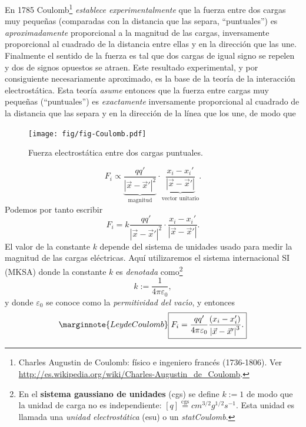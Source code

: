 En 1785 Coulomb\footnote{Charles Augustin de Coulomb: físico e ingeniero francés (1736-1806). Ver \url{http://es.wikipedia.org/wiki/Charles-Augustin_de_Coulomb}.} \textit{establece experimentalmente} que la fuerza entre dos cargas muy peque\~nas (comparadas con la distancia que las separa, ``puntuales'') es \textit{aproximadamente}  proporcional a la magnitud de las cargas, inversamente proporcional al cuadrado de la distancia entre ellas y en la dirección que las
une. Finalmente el sentido de la fuerza es tal que dos cargas de igual signo se repelen y dos de signos opuestos se atraen. Este resultado experimental, y por consiguiente necesariamente aproximado, es la base de la teoría de la interacción electrostática. Esta teoría \textit{asume} entonces que la fuerza entre cargas muy pequeñas (``puntuales'') es \textit{exactamente} inversamente proporcional al cuadrado de la distancia que las separa y en la dirección de la línea que los une, de modo que
\begin{center}
\begin{figure}[H]
\centerline{\texttt{[image: fig/fig-Coulomb.pdf]}}
\caption{Fuerza electrostática entre dos cargas puntuales.}
\label{fig:Coulomb}
\end{figure}
\end{center}
\begin{equation}
F_i\propto \underbrace{\frac{qq'}{\left\vert \vec x-\vec
x'\right\vert^2}}_\text{magnitud}\cdot
\underbrace{\frac{x_i-x_i'}{\left\vert \vec x-\vec x'\right\vert }}_\text{vector unitario}.
\end{equation}
Podemos por tanto escribir
\begin{equation}
F_i=k\frac{qq'}{\left\vert \vec x-\vec x'\right\vert^2}
\cdot\frac{x_i-x_i'}{\left\vert \vec x-\vec x'\right\vert }.
\end{equation}
El valor de la constante $k$ depende del sistema de unidades usado para medir la magnitud de las cargas eléctricas. Aquí utilizaremos el sistema internacional SI (MKSA) donde la constante $k$ es \textit{denotada} como\footnote{En el \textbf{sistema gaussiano de unidades} (cgs) se define $k:=1$ de modo que la unidad de carga no es independiente: $[q]\stackrel{\text{cgs}}{=}cm^{3/2}g^{1/2}s^{-1}$. Esta unidad es llamada una \textit{unidad electrostática} (esu) o un \textit{statCoulomb}.}%
\begin{equation}
k:=\frac{1}{4\pi\varepsilon_0},
\end{equation}
y donde $\varepsilon_0$ se conoce como la \textit{permitividad del vac\'{\i}o}, y entonces
\begin{equation}\marginnote{Ley de Coulomb}
\boxed{F_i=\frac{qq'}{4\pi\varepsilon_0}\frac{\left(  x_i-x_i^{\prime
}\right)  }{\left\vert \vec x-\vec x'\right\vert ^3}.}\label{leycoulomb}%
\end{equation}
